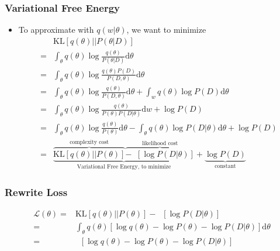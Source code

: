 \begin{frame}
  \frametitle{Variational Free Energy}
  \begin{itemize}
  \item To approximate with $q(w | \theta)$, we want to minimize
    \begin{align*}
       & \mathrm{KL}[q(\theta) || P(\theta | D)] \\
      =& \int_\theta q(\theta) \log \frac{q(\theta)}{P(\theta | D)} \mathrm{d} \theta \\
      =& \int_\theta q(\theta) \log \frac{q(\theta) P(D)}{P(D, \theta)} \mathrm{d} \theta \\
      =& \int_\theta q(\theta) \log \frac{q(\theta)}{P(D, \theta)} \mathrm{d} \theta +
      \int_w q(\theta) \log P(D) \mathrm{d} \theta\\
      =& \int_\theta q(\theta) \log \frac{q(\theta)}{P(\theta) P(D | \theta)} \mathrm{d} w + \log P(D) \\
      =& \int_\theta q(\theta) \log \frac{q(\theta)}{P(\theta)} \mathrm{d} \theta
         - \int_\theta q(\theta) \log P(D | \theta) \mathrm{d} \theta + \log P(D) \\
      =& \underbrace{
             \overbrace{\mathrm{KL}[q(\theta) || P(\theta)]}^{\text{complexity cost}}
             \overbrace{-\mathop{\mathbb{E}_{q(\theta)}}[\log P(D | \theta)]}^{\text{likelihood cost}}
         }_{\text{Variational Free Energy, to minimize}}
         + \underbrace{\log P(D)}_{\text{constant}}
    \end{align*}
  \end{itemize}
\end{frame}


\begin{frame}
  \frametitle{Rewrite Loss}
  \begin{align*}
    \mathcal{L}(\theta) 
    =& \mathrm{KL}[q(\theta) || P(\theta)] - \mathop{\mathbb{E}_{q(\theta)}}[\log P(D | \theta)] \\
    =& \int_\theta q(\theta) [\log q(\theta) - \log P(\theta) - \log P(D | \theta)] \mathrm{d} \theta \\
    =& \mathop{\mathbb{E}_{q(\theta)} }[\log q(\theta) - \log P(\theta) - \log P(D | \theta)]
  \end{align*}
  
\end{frame}


